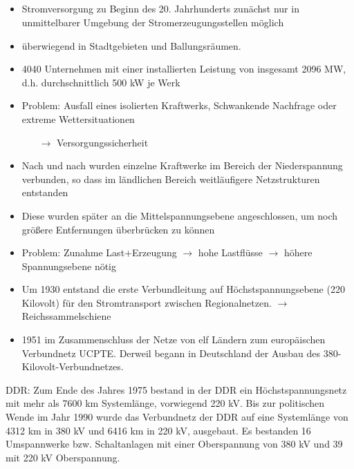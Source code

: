 \documentclass[paper=a4, fontsize=12pt]{article}
\begin{document}
\subsection*{\citeauthor{50Hertz} \cite{50Hertz}}

\begin{itemize}
\item Stromversorgung zu Beginn des 20. Jahrhunderts zun\"achst nur in unmittelbarer Umgebung der Stromerzeugungsstellen m\"oglich
\item \"uberwiegend in Stadtgebieten und Ballungsr\"aumen.
\item 4040 Unternehmen mit einer installierten Leistung von insgesamt 2096 MW, d.h. durchschnittlich 500 kW je Werk
\item Problem: Ausfall eines isolierten Kraftwerks, Schwankende Nachfrage oder extreme Wettersituationen
\begin{itemize}
\item[$\rightarrow$] Versorgungssicherheit
\end{itemize} 

\item Nach und nach wurden einzelne Kraftwerke im Bereich der Niederspannung verbunden, so dass im l\"andlichen Bereich weitl\"aufigere Netzstrukturen entstanden
\item Diese wurden sp\"ater an die Mittelspannungsebene angeschlossen, um noch gr\"oßere Entfernungen \"uberbr\"ucken zu k\"onnen
\item Problem: Zunahme Last+Erzeugung $\rightarrow$ hohe Lastfl\"usse $\rightarrow$ h\"ohere Spannungsebene n\"otig

\item Um 1930 entstand die erste Verbundleitung auf H\"ochstspannungsebene (220 Kilovolt) f\"ur den Stromtransport zwischen Regionalnetzen.
$\rightarrow$ \glqq{}Reichssammelschiene\grqq{}

\item 1951 im Zusammenschluss der Netze von elf L\"andern zum europ\"aischen Verbundnetz UCPTE. Derweil begann in Deutschland
 der Ausbau des 380-Kilovolt-Verbundnetzes.
\end{itemize}

DDR:
Zum Ende des Jahres 1975 bestand in der DDR ein H\"ochstspannungsnetz mit mehr als 7600 km Systeml\"ange, vorwiegend 220
kV.  Bis zur politischen Wende im Jahr 1990 wurde das Verbundnetz der DDR auf eine Systeml\"ange von 4312 km in 380 kV und
6416 km in 220 kV, ausgebaut. Es bestanden 16 Umspannwerke bzw. Schaltanlagen mit einer Oberspannung von 380 kV und 39
mit 220 kV Oberspannung.
\end{document}
